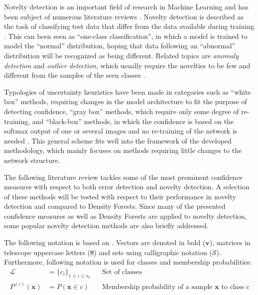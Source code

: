 \documentclass[10pt]{article}
\begin{document}
Novelty detection is an important field of research in Machine Learning and has been subject of numerous literature reviews \cite{Bishop1994NoveltyDA, Markou2003NoveltyDApt1,Markou2003NoveltyDApt2,Pimentel2014ARO, deMorsier2014thesis}. Novelty detection is described as the task of classifying test data that differ from the data available during training \cite{Pimentel2014ARO}. This can been seen as ``one-class classification'', in which a model is trained to model the ``normal'' distribution, hoping that data following an ``abnormal'' distribution will be recognized as being different. Related topics are  \textit{anomaly detection} and \textit{outlier detection}, which usually require the novelties to be few and different from the samples of the seen classes \cite{deMorsier2014thesis, Pimentel2014ARO}.

Typologies of uncertainty heuristics have been made in categories such as ``white box'' methods, requiring changes in the model architecture to fit the purpose of detecting confidence, ``gray box'' methods, which require only some degree of re-training, and ``black-box'' methods, in which the confidence is based on the softmax output of one or several images and no re-training of the network is needed \cite{Bahat_2018}. This general scheme fits well into the framework of the developed methodology, which mainly focuses on methods requiring little changes to the network structure.

The following literature review tackles some of the most prominent confidence measures with respect to both error detection and novelty detection. A selection of these methods will be tested with respect to their performance in novelty detection and compared to Density Forests. Since many of the  presented confidence measures as well as Density Forests are applied to novelty detection, some popular novelty detection methods are also briefly addressed.

The following notation is based on \cite{decisionForests-MSR}. Vectors are denoted in bold ($\mathbf{v}$), matrices in telescope uppercase letters ($\mathtt{M}$) and sets using calligraphic notation ($\mathcal{S}$). Furthermore, following notation is used for classes and membership probabilities:
\begin{align}
\mathcal{L}&=\{c_i\}_{1\leq i\leq n_c}&& \text{Set of classes}\\
P^{(c)}(\mathbf{x})&=P(\mathbf{x}\in c)&& \text{Membership probability of a sample } \mathbf{x} \text{ to class }c
\end{align}
\end{document}
